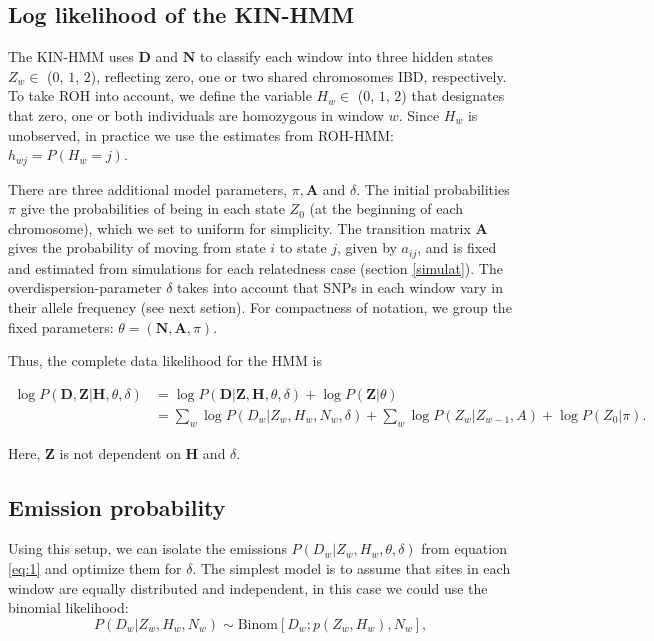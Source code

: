 \documentclass[12pt, letterpaper]{article}
\newcommand{\BZ}{\mathbf{Z}}
\newcommand{\BD}{\mathbf{D}}
\newcommand{\BN}{\mathbf{N}}
\newcommand{\BH}{\mathbf{H}}
\begin{document}
\subsection{Log likelihood of the KIN-HMM}\label{ll}
The KIN-HMM uses $\BD$ and $\BN$ to classify each window into three hidden states $Z_w \in$ ($0$, $1$, $2$), reflecting zero, one or two shared chromosomes IBD, respectively. To take ROH into account, we define the variable $H_w \in$ ($0$, $1$, $2$) that designates that zero, one or both individuals are homozygous in window $w$. Since $H_w$ is unobserved, in practice we use the estimates from ROH-HMM: $h_{wj} = P(H_w = j)$. 

There are three additional model parameters, $\pi, \mathbf{A}$ and $\delta$. The initial probabilities $\pi$ give the probabilities of being in each state $Z_0$ (at the beginning of each chromosome), which we set to uniform for simplicity. The transition matrix $\mathbf{A}$ gives the probability of moving from state $i$ to state $j$, given by $a_{ij}$, and is fixed and estimated from simulations for each relatedness case (section \ref{simulat}). The overdispersion-parameter $\delta$ takes into account that SNPs in each window vary in their allele frequency (see next setion).  For compactness of notation, we group the fixed parameters: $\theta = (\BN, \mathbf{A}, \pi)$. 

Thus, the complete data likelihood for the HMM is

\begin{align}\label{eq:1}
\log P(\BD,\BZ|\BH, \theta, \delta) &= \log P(\BD|\BZ,\BH, \theta, \delta) + \log P(\BZ |\theta) \nonumber\\
&= \sum_w \log P(D_w|Z_w,H_w, N_w, \delta) + \sum_w \log P(Z_w |Z_{w-1},A) + \log P(Z_0|\pi)\text{.}
\end{align}

Here, $\BZ$ is not dependent on $\BH$ and $\delta$.

\subsection{Emission probability}\label{B}

Using this setup, we can isolate the emissions $P(D_w | Z_w, H_w ,\theta, \delta)$ from equation \ref{eq:1} and optimize them for $\delta$. The simplest model is to assume that sites in each window are equally distributed and independent, in this case we could use the  binomial likelihood:
$$P(D_w|Z_w, H_w, N_w) \sim \text{Binom}[D_w ; p(Z_w, H_w), N_w] \text{,}$$
\end{document}
